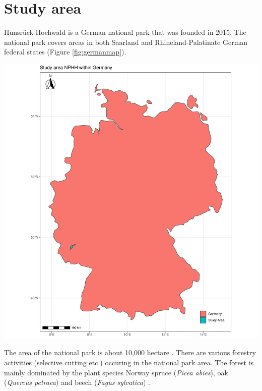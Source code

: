 \documentclass[a4paper, twoside]{templates/ociamthesis}
\let\origfigure\figure
\let\endorigfigure\endfigure
\renewenvironment{figure}[1][2] {
    \expandafter\origfigure\expandafter[H]
} {
    \endorigfigure
}
\begin{document}
\hypertarget{study-area}{%
\chapter{Study area}\label{study-area}}

Hunsrück-Hochwald is a German national park that was founded in 2015. The national park covers areas in both Saarland and Rhineland-Palatinate German federal states (Figure \ref{fig:germanmap}).

\begin{figure}
\includegraphics[width=0.9\linewidth]{./figures/map_germany} \caption{The study area on Germany's map.}\label{fig:germanmap}
\end{figure}

The area of the national park is about 10,000 hectare \citep{fischer2016scientific}. There are various forestry activities (selective cutting etc.) occuring in the national park area. The forest is mainly dominated by the plant species Norway spruce (\emph{Picea abies}), oak (\emph{Quercus petraea}) and beech (\emph{Fagus sylvatica}) \citep{buddenbaum2015nationalpark}.
\end{document}
